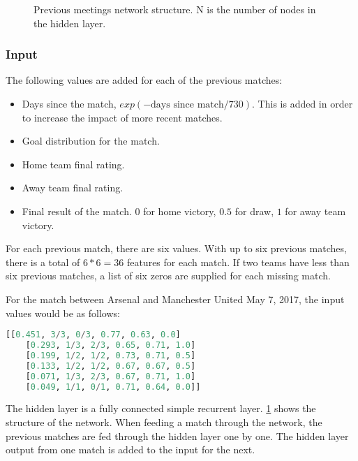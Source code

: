 \begin{figure}
    \caption{Previous meetings network structure. N is the number of nodes in the hidden layer.}
    \label{fig:network-previous-meetings-to-result}
\end{figure}

\subsubsection{Input}

The following values are added for each of the previous matches:
\begin{itemize}[noitemsep]
    \item Days since the match, $exp(-\text{days since match} / 730)$. This is added in order to increase the impact of more recent matches.
    \item Goal distribution for the match.
    \item Home team final rating.
    \item Away team final rating.
    \item Final result of the match. $0$ for home victory, $0.5$ for draw, $1$ for away team victory.
\end{itemize}

For each previous match, there are six values. With up to six previous matches, there is a total of $6 * 6 = 36$ features for each match. If two teams have less than six previous matches, a list of six zeros are supplied for each missing match.

For the match between Arsenal and Manchester United May 7, 2017, the input values would be as follows:
\begin{lstlisting}[language=Python]
    [[0.451, 3/3, 0/3, 0.77, 0.63, 0.0]
    [0.293, 1/3, 2/3, 0.65, 0.71, 1.0]
    [0.199, 1/2, 1/2, 0.73, 0.71, 0.5]
    [0.133, 1/2, 1/2, 0.67, 0.67, 0.5]
    [0.071, 1/3, 2/3, 0.67, 0.71, 1.0]
    [0.049, 1/1, 0/1, 0.71, 0.64, 0.0]]
\end{lstlisting}

The hidden layer is a fully connected simple recurrent layer. \cref{fig:network-previous-meetings-to-result} shows the structure of the network. When feeding a match through the network, the previous matches are fed through the hidden layer one by one. The hidden layer output from one match is added to the input for the next.